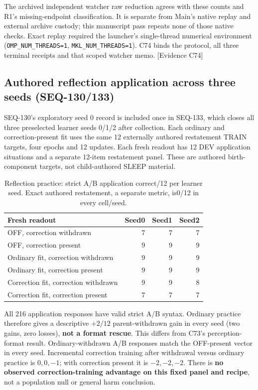 \documentclass[11pt]{article}
\newcommand{\ev}[1]{\textsf{[Evidence #1]}}
\begin{document}
The archived independent watcher raw reduction agrees with these counts and
R1's missing-endpoint classification. It is separate from Main's native replay
and external archive custody; this manuscript pass repeats none of those native
checks. Exact replay required the launcher's single-thread numerical environment
(\texttt{OMP\_NUM\_THREADS=1}, \texttt{MKL\_NUM\_THREADS=1}). C74 binds the
protocol, all three terminal receipts and that scoped watcher memo. \ev{C74}

\subsection{Authored reflection application across three seeds (SEQ-130/133)}
SEQ-130's exploratory seed 0 record is included once in SEQ-133, which closes
all three preselected learner seeds 0/1/2 after collection. Each ordinary and
correction-present fit uses the same 12 externally authored restatement TRAIN
targets, four epochs and 12 updates. Each fresh readout has 12 DEV application
situations and a separate 12-item restatement panel. These are authored
birth-component targets, not child-authored SLEEP material.

\begin{table}[ht]
\centering
\caption{Reflection practice: strict A/B application correct/12 per learner
seed. Exact authored restatement, a separate metric, is0/12 in every cell/seed.}
\begin{tabular}{lrrr}
\toprule
Fresh readout & Seed0 & Seed1 & Seed2 \\
\midrule
OFF, correction withdrawn & 7 & 7 & 7 \\
OFF, correction present & 9 & 9 & 9 \\
Ordinary fit, correction withdrawn & 9 & 9 & 9 \\
Ordinary fit, correction present & 9 & 9 & 9 \\
Correction fit, correction withdrawn & 9 & 9 & 8 \\
Correction fit, correction present & 7 & 7 & 7 \\
\bottomrule
\end{tabular}
\end{table}

All 216 application responses have valid strict A/B syntax. Ordinary practice
therefore gives a descriptive $+2/12$ parent-withdrawn gain in every seed
(two gains, zero losses), \textbf{not a format rescue}. This differs from C73's
perception-format result. Ordinary-withdrawn A/B responses match the OFF-present
vector in every seed. Incremental correction training after withdrawal versus
ordinary practice is $0, 0, -1$; with correction present it is $-2, -2, -2$.
There is \textbf{no observed correction-training advantage on this fixed panel
and recipe}, not a population null or general harm conclusion.
\end{document}
